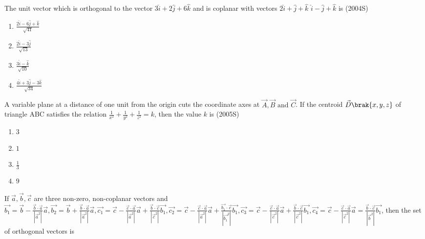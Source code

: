 \iffalse
\title{Vector Algebra}
\author{EE24Btech11022 - Eshan Sharma}
\section{mcq-single}
\fi
    \item The unit vector which is orthogonal to the vector $3\hat{i} + 2\hat{j} + 6\hat{k}$ and is coplanar with vectors $2\hat{i} + \hat{j} + \hat{k}$  $\hat{i} - \hat{j} + \hat{k}$ is 
    \hfill{(2004S)}
    \begin{multicols}{2}
    \begin{enumerate}
    \item $\frac{2\hat{i} - 6\hat{j} + \hat{k}}{\sqrt{41}}$
    \item $\frac{2\hat{i} - 3\hat{j}}{\sqrt{13}}$
    \item $\frac{3\hat{i} - \hat{k}}{\sqrt{10}}$
    \item $\frac{4\hat{i} + 3\hat{j} - 3\hat{k}}{\sqrt{34}}$
    \end{enumerate}
    \end{multicols}
    \item A variable plane at a distance of one unit from the origin cuts the coordinate axes at $\vec{A}, \vec{B} \text{ and } \vec{C}$. If the centroid $\vec{D} \brak{x,y,z}$ of triangle ABC satisfies the relation $\frac{1}{x^{2}} + \frac{1}{y^{2}} + \frac{1}{z^{2}} = k$, then the value $k$ is
    \hfill{(2005S)}
    \begin{multicols}{2}
    \begin{enumerate}
    \item $3$
    \item $1$
    \item $\frac{1}{3}$
    \item $9$
    \end{enumerate}
    \end{multicols}
    \item If $\vec{a}, \vec{b}, \vec{c}$ are three non-zero, non-coplanar vectors and $\vec{b_1} = \vec{b} - \frac{\vec{b} \cdot \vec{a}}{|\vec{a}^2|} \vec{a}, \vec{b_2} = \vec{b} + \frac{\vec{b} \cdot \vec{a}}{|\vec{a}^2|} \vec{a}, \vec{c_1} = \vec{c} - \frac{\vec{c} \cdot \vec{a}}{|\vec{a}^2|} \vec{a} + \frac{\vec{b} \cdot \vec{c}}{|\vec{c}^2|} \vec{b_1}, \vec{c_2} = \vec{c} - \frac{\vec{c} \cdot \vec{a}}{|\vec{a}^2|} \vec{a} + \frac{\vec{b_1} \cdot \vec{c}}{|\vec{b_1}^2|} \vec{b_1}, \vec{c_3} = \vec{c} - \frac{\vec{c} \cdot \vec{a}}{|\vec{c}^2|} \vec{a} + \frac{\vec{b} \cdot \vec{c}}{|\vec{c}^2|} \vec{b_1}, \vec{c_4} = \vec{c} - \frac{\vec{c} \cdot \vec{a}}{|\vec{c}^2|} \vec{a} = \frac{\vec{b} \cdot \vec{c}}{|\vec{b}^2|} \vec{b_1}$, then the set of orthogonal vectors is 
